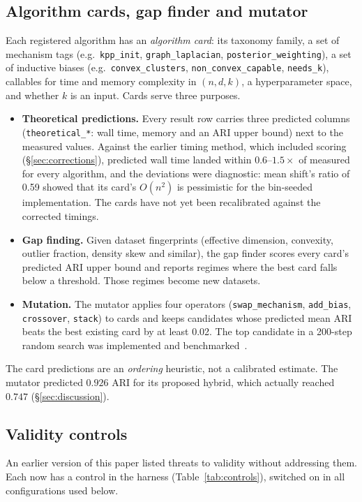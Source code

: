 \documentclass[11pt,a4paper]{article}
\newcommand{\code}[1]{\texttt{#1}}
\begin{document}
\subsection{Algorithm cards, gap finder and mutator}\label{sec:cards}
Each registered algorithm has an \emph{algorithm card}: its taxonomy family,
a set of mechanism tags (e.g.\ \code{kpp\_init}, \code{graph\_laplacian},
\code{posterior\_weighting}), a set of inductive biases (e.g.\
\code{convex\_clusters}, \code{non\_convex\_capable}, \code{needs\_k}),
callables for time and memory complexity in $(n, d, k)$, a hyperparameter
space, and whether $k$ is an input. Cards serve three purposes.
\begin{itemize}
  \item \textbf{Theoretical predictions.} Every result row carries three
  predicted columns (\code{theoretical\_*}: wall time, memory and an ARI
  upper bound) next to the measured values. Against the earlier timing
  method, which included scoring (\S\ref{sec:corrections}), predicted wall
  time landed within $0.6$--$1.5\times$ of measured for every algorithm, and
  the deviations were diagnostic: mean shift's ratio of 0.59 showed that its
  card's $O(n^2)$ is pessimistic for the bin-seeded implementation. The cards
  have not yet been recalibrated against the corrected timings.
  \item \textbf{Gap finding.} Given dataset fingerprints (effective
  dimension, convexity, outlier fraction, density skew and similar), the gap
  finder scores every card's predicted ARI upper bound and reports regimes
  where the best card falls below a threshold. Those regimes become new
  datasets.
  \item \textbf{Mutation.} The mutator applies four operators
  (\code{swap\_mechanism}, \code{add\_bias}, \code{crossover},
  \code{stack}) to cards and keeps candidates whose predicted mean ARI beats
  the best existing card by at least 0.02. The top candidate in a 200-step
  random search was implemented and benchmarked~\cite{clustbenchalgos}.
\end{itemize}
The card predictions are an \emph{ordering} heuristic, not a calibrated
estimate. The mutator predicted $0.926$ ARI for its proposed hybrid, which
actually reached $0.747$ (\S\ref{sec:discussion}).

\subsection{Validity controls}\label{sec:validity}
An earlier version of this paper listed threats to validity without
addressing them. Each now has a control in the harness
(Table~\ref{tab:controls}), switched on in all configurations used below.
\end{document}
